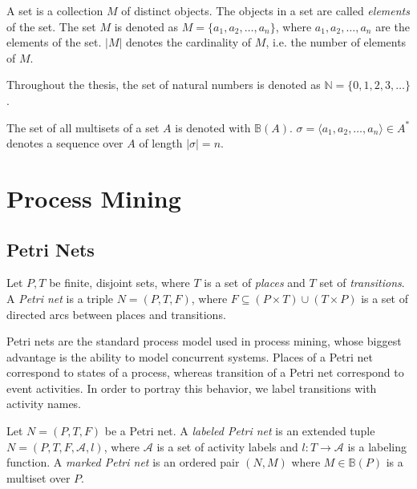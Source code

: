 \begin{definition}[Set]
    A set is a collection $M$ of distinct objects. The objects in a set are called \emph{elements} of the set. The set $M$ is denoted as $M = \{ a_1, a_2, \dots, a_n \}$, where $a_1, a_2, \dots, a_n$ are the elements of the set. $\lvert M \rvert$ denotes the cardinality of $M$, i.e. the number of elements of $M$.
\end{definition}

Throughout the thesis, the set of natural numbers is denoted as $\mathbb{N} = \{0, 1, 2, 3, \dots\}$.

\begin{definition}
    The set of all multisets of a set $A$ is denoted with $\mathbb{B}(A)$. $\sigma = \langle a_1, a_2, \dots, a_n \rangle \in A^*$ denotes a sequence over $A$ of length $\lvert \sigma \rvert = n$. 
\end{definition}

\section{Process Mining}



\subsection{Petri Nets}

\begin{definition}
\label{def:petrinet}
    Let $P, T$ be finite, disjoint sets, where $T$ is a set of \emph{places} and $T$ set of \emph{transitions}. A \emph{Petri net} is a triple $N = (P, T, F)$, where $F \subseteq (P \times T) \cup (T \times P)$ is a set of directed arcs between places and transitions.
\end{definition}

Petri nets are the standard process model used in process mining, whose biggest advantage is the ability to model concurrent systems. Places of a Petri net correspond to states of a process, whereas transition of a Petri net correspond to event activities. In order to portray this behavior, we label transitions with activity names.

\begin{definition}
    Let $N = (P, T, F)$ be a Petri net. A \emph{labeled Petri net} is an extended tuple $N = (P, T, F, \mathcal{A}, l)$, where $\mathcal{A}$ is a set of activity labels and $l: T \rightarrow \mathcal{A}$ is a labeling function. A \emph{marked Petri net} is an ordered pair $(N, M)$ where $M \in \mathbb{B}(P)$ is a multiset over $P$.
\end{definition}

